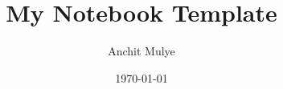 \newpage
\thispagestyle{empty} %
\title{My Notebook Template}
\author{Anchit Mulye}
\date{\today}
\maketitle

\tableofcontents
\newpage